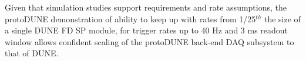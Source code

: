 Given that simulation studies support requirements and rate
assumptions, the protoDUNE demonstration of ability to keep up with
rates from 1/25$^{th}$ the size of a single DUNE FD SP module, for trigger
rates up to 40 Hz and 3 ms readout window 
allows confident scaling of the protoDUNE back-end DAQ subsystem to
that of DUNE.








